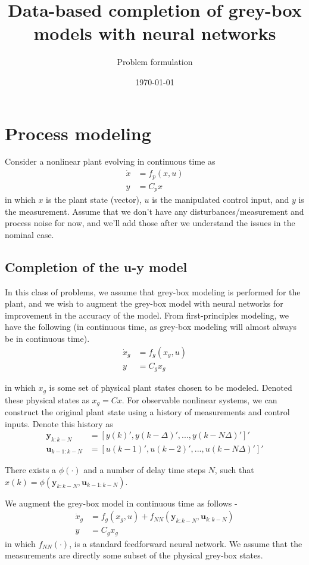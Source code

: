 \documentclass{article}
\title{Data-based completion of grey-box models with neural networks}
\author{Problem formulation}
\date{\today}
\begin{document}
\maketitle

\section{Process modeling}
Consider a nonlinear plant evolving in continuous time as
\begin{align*}
  \dot x &= f_p(x, u) \\
  y &= C_px
\end{align*}
in which $x$ is the plant state (vector), $u$ is the manipulated control input,
and $y$ is the measurement. Assume that we don't have any 
disturbances/measurement and process noise 
for now, and we'll add those after we 
understand the issues in the nominal case.

\subsection{Completion of the u-y model}
In this class of problems, we assume that grey-box modeling is performed 
for the plant, and we wish to augment the grey-box model with neural networks
for improvement in the accuracy of the model. From first-principles modeling, 
we have the following (in continuous time, as grey-box modeling will 
almost always be in continuous time).
\begin{align*}
  \dot{x}_g &= f_g(x_g, u) \\
  y &= C_gx_g
\end{align*}

in which $x_g$ is some set of physical plant states chosen to be 
modeled. Denoted these physical states as $x_g=Cx$.
For observable nonlinear systems, 
we can construct the original plant state
using a history of measurements and control inputs.
Denote this history as 
\begin{align*}
  \mathbf{y}_{k:k-N} &= [y(k)', y(k-\Delta)', ..., y(k-N\Delta)']' \\
  \mathbf{u}_{k-1:k-N} &= [u(k-1)', u(k-2)', ..., u(k-N\Delta)']'
\end{align*}

There exists a $\phi(\cdot)$ and a number of delay 
time steps $N$, such that 
$x(k) = \phi(\mathbf{y}_{k:k-N}, \mathbf{u}_{k-1:k-N})$.

We augment the grey-box model in continuous time 
as follows -
\begin{align*}
\dot x_g &= f_g(x_g, u) + 
f_{NN}(\mathbf{y}_{k:k-N}, \mathbf{u}_{k:k-N})\\
y &= C_gx_g 
\end{align*}
in which $f_{NN}(\cdot)$,
is a standard feedforward neural network. 
We assume that the measurements
are directly some subset of the physical grey-box states.
\end{document}
